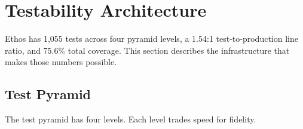 \documentclass[a4paper,10pt]{article}
\begin{document}
\section{Testability Architecture}
\label{sec:testability}

Ethos has 1,055 tests across four pyramid levels, a 1.54:1 test-to-production
line ratio, and 75.6\% total coverage.  This section describes the
infrastructure that makes those numbers possible.

\subsection{Test Pyramid}

The test pyramid has four levels.  Each level trades speed for fidelity.
\end{document}
